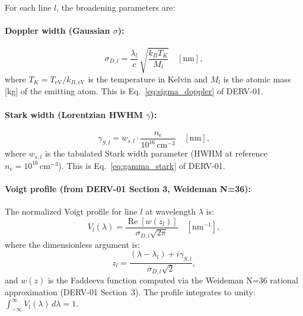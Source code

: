 \documentclass[11pt]{article}
\newcommand{\TeV}{T_\mathrm{eV}}
\newcommand{\ne}{n_\mathrm{e}}
\newcommand{\wfn}{w}
\begin{document}
For each line $l$, the broadening parameters are:

\paragraph{Doppler width (Gaussian $\sigma$):}
\begin{equation}
  \label{eq:sigma-doppler}
  \sigma_{D,l} = \frac{\lambda_l}{c}\,\sqrt{\frac{k_B T_K}{M_l}}
  \quad [\mathrm{nm}],
\end{equation}
where $T_K = \TeV / k_{B,\mathrm{eV}}$ is the temperature in Kelvin and $M_l$ is
the atomic mass [kg] of the emitting atom. This is Eq.~\eqref{eq:sigma_doppler}
of DERV-01.

\paragraph{Stark width (Lorentzian HWHM $\gamma$):}
\begin{equation}
  \label{eq:gamma-stark}
  \gamma_{S,l} = w_{s,l} \cdot \frac{\ne}{10^{16}\,\mathrm{cm}^{-3}}
  \quad [\mathrm{nm}],
\end{equation}
where $w_{s,l}$ is the tabulated Stark width parameter (HWHM at reference
$\ne = 10^{16}$\,cm$^{-3}$). This is Eq.~\eqref{eq:gamma_stark} of DERV-01.

\paragraph{Voigt profile (from DERV-01 Section 3, Weideman N=36):}
The normalized Voigt profile for line $l$ at wavelength $\lambda$ is:
\begin{equation}
  \label{eq:voigt-profile}
  V_l(\lambda) = \frac{\operatorname{Re}[\wfn(z_l)]}{\sigma_{D,l}\sqrt{2\pi}}
  \quad [\mathrm{nm}^{-1}],
\end{equation}
where the dimensionless argument is:
\begin{equation}
  \label{eq:z-voigt}
  z_l = \frac{(\lambda - \lambda_l) + i\gamma_{S,l}}{\sigma_{D,l}\sqrt{2}},
\end{equation}
and $\wfn(z)$ is the Faddeeva function computed via the Weideman N=36
rational approximation (DERV-01 Section~3). The profile integrates to unity:
$\int_{-\infty}^{\infty} V_l(\lambda)\,d\lambda = 1$.
\end{document}
